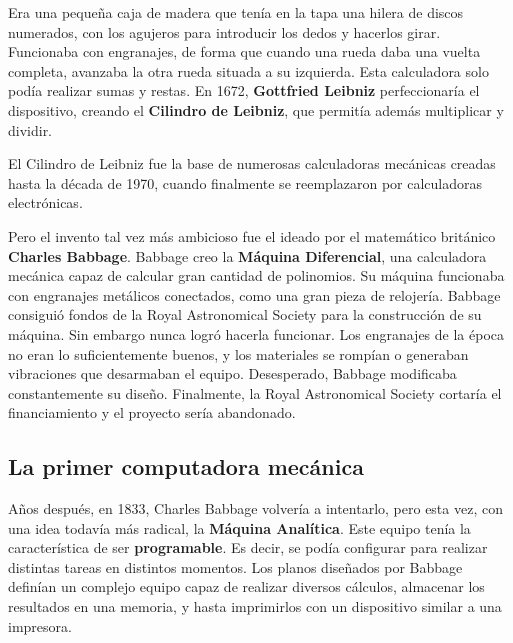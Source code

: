 Era una pequeña caja de madera que tenía en la tapa una hilera de discos
numerados, con los agujeros para introducir los dedos y hacerlos girar.
Funcionaba con engranajes, de forma que cuando una rueda daba una vuelta
completa, avanzaba la otra rueda situada a su izquierda. Esta calculadora solo
podía realizar sumas y restas. En 1672, \textbf{Gottfried Leibniz}
perfeccionaría el dispositivo, creando el \textbf{Cilindro de Leibniz}, que
permitía además multiplicar y dividir.\autocite{chase_1980}

\begin{knowwhat}
    El Cilindro de Leibniz fue la base de numerosas calculadoras mecánicas creadas
    hasta la década de 1970, cuando finalmente se reemplazaron por calculadoras
    electrónicas.
\end{knowwhat}

Pero el invento tal vez más ambicioso fue el ideado por el matemático británico
\textbf{Charles Babbage}. Babbage creo la \textbf{Máquina Diferencial}, una
calculadora mecánica capaz de calcular gran cantidad de polinomios. Su máquina
funcionaba con engranajes metálicos conectados, como una gran pieza de
relojería. Babbage consiguió fondos de la Royal Astronomical Society para la
construcción de su máquina. Sin embargo nunca logró hacerla funcionar. Los
engranajes de la época no eran lo suficientemente buenos, y los materiales se
rompían o generaban vibraciones que desarmaban el equipo. Desesperado, Babbage
modificaba constantemente su diseño. Finalmente, la Royal Astronomical
Society cortaría el financiamiento y el proyecto sería abandonado.

\subsection{La primer computadora mecánica}

Años después, en 1833, Charles Babbage volvería a intentarlo, pero esta vez, con
una idea todavía más radical, la \textbf{Máquina Analítica}. Este equipo tenía
la característica de ser \textbf{programable}. Es decir, se podía
configurar para realizar distintas tareas en distintos momentos. Los planos
diseñados por Babbage definían un complejo equipo capaz de realizar diversos
cálculos, almacenar los resultados en una memoria, y hasta imprimirlos con un
dispositivo similar a una impresora.\

